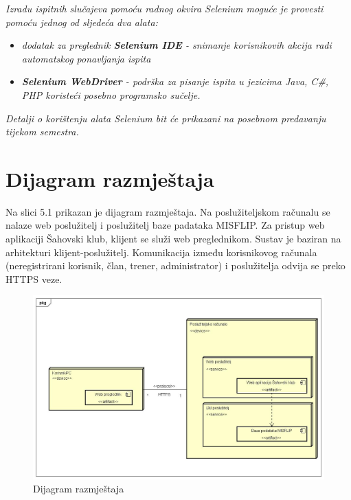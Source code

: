 			 \textit{Izradu ispitnih slučajeva pomoću radnog okvira Selenium moguće je provesti pomoću jednog od sljedeća dva alata:}
			 \begin{itemize}
			 	\item \textit{dodatak za preglednik \textbf{Selenium IDE} - snimanje korisnikovih akcija radi automatskog ponavljanja ispita	}
			 	\item \textit{\textbf{Selenium WebDriver} - podrška za pisanje ispita u jezicima Java, C\#, PHP koristeći posebno programsko sučelje.}
			 \end{itemize}
		 	\textit{Detalji o korištenju alata Selenium bit će prikazani na posebnom predavanju tijekom semestra.}
			
			\eject 
		
		
		\section{Dijagram razmještaja}
			
			
			Na slici 5.1 prikazan je dijagram razmještaja. Na poslužiteljskom računalu se nalaze web poslužitelj i poslužitelj baze padataka MISFLIP. Za pristup web aplikaciji Šahovski klub, klijent se služi web preglednikom. Sustav je baziran na arhitekturi klijent-poslužitelj. Komunikacija između korisnikovog računala (neregistrirani korisnik, član, trener, administrator) i poslužitelja odvija se preko HTTPS veze.
			
			\begin{figure}[H]
				\centerfloat
				\includegraphics[scale=0.40]{dijagrami/Dijagramrazmjestaja.jpg} %
				\caption{Dijagram razmještaja}
				
			\end{figure}
			
